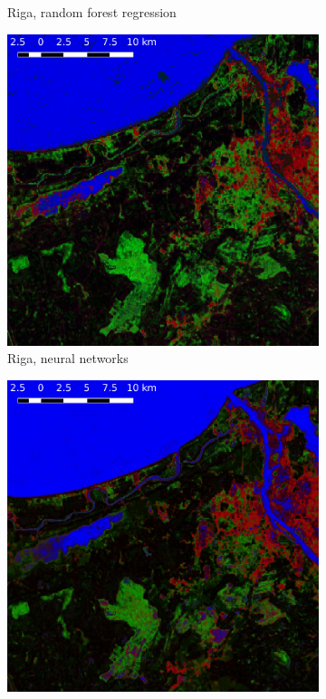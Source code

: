 \documentclass[a4paper,12pt]{scrbook}
\begin{document}
\begin{figure}
\begin{subfigure}[t]{.23\textwidth}
    \caption{Riga, random forest regression}
    \label{subfig-riga-rf}
  \end{subfigure} \hfill
  \begin{subfigure}[t]{.23\textwidth}
    \includegraphics[width=\textwidth]{thesis-figures/figures-qgis/riga-nn}
    \caption{Riga, neural networks}
  \end{subfigure} \hfill
  \begin{subfigure}[t]{.23\textwidth}
    \includegraphics[width=\textwidth]{thesis-figures/figures-qgis/riga-cm}

\end{subfigure}
\end{figure}
\end{document}
